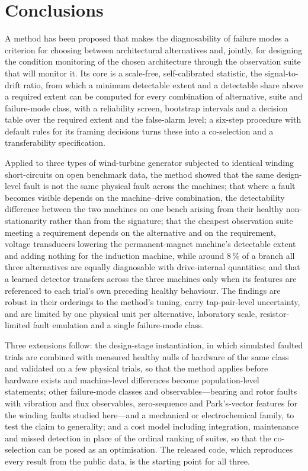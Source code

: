 \section{Conclusions}\label{sec:conclusion}

A method has been proposed that makes the diagnosability of failure modes a criterion for choosing between architectural alternatives and, jointly, for designing the condition monitoring of the chosen architecture through the observation suite that will monitor it. Its core is a scale-free, self-calibrated statistic, the signal-to-drift ratio, from which a minimum detectable extent and a detectable share above a required extent can be computed for every combination of alternative, suite and failure-mode class, with a reliability screen, bootstrap intervals and a decision table over the required extent and the false-alarm level; a six-step procedure with default rules for its framing decisions turns these into a co-selection and a transferability specification.

Applied to three types of wind-turbine generator subjected to identical winding short-circuits on open benchmark data, the method showed that the same design-level fault is not the same physical fault across the machines; that where a fault becomes visible depends on the machine--drive combination, the detectability difference between the two machines on one bench arising from their healthy non-stationarity rather than from the signature; that the cheapest observation suite meeting a requirement depends on the alternative and on the requirement, voltage transducers lowering the permanent-magnet machine's detectable extent and adding nothing for the induction machine, while around 8\,\% of a branch all three alternatives are equally diagnosable with drive-internal quantities; and that a learned detector transfers across the three machines only when its features are referenced to each trial's own preceding healthy behaviour. The findings are robust in their orderings to the method's tuning, carry tap-pair-level uncertainty, and are limited by one physical unit per alternative, laboratory scale, resistor-limited fault emulation and a single failure-mode class.

Three extensions follow: the design-stage instantiation, in which simulated faulted trials are combined with measured healthy nulls of hardware of the same class and validated on a few physical trials, so that the method applies before hardware exists and machine-level differences become population-level statements; other failure-mode classes and observables---bearing and rotor faults with vibration and flux observables, zero-sequence and Park's-vector features for the winding faults studied here---and a mechanical or electrochemical family, to test the claim to generality; and a cost model including integration, maintenance and missed detection in place of the ordinal ranking of suites, so that the co-selection can be posed as an optimisation. The released code, which reproduces every result from the public data, is the starting point for all three.
